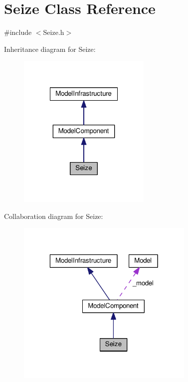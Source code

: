 \hypertarget{class_seize}{\section{Seize Class Reference}
\label{class_seize}
}


{\ttfamily \#include $<$Seize.\-h$>$}



Inheritance diagram for Seize\-:
\nopagebreak
\begin{figure}[H]
\begin{center}
\leavevmode
\includegraphics[width=180pt]{class_seize__inherit__graph}
\end{center}
\end{figure}


Collaboration diagram for Seize\-:
\nopagebreak
\begin{figure}[H]
\begin{center}
\leavevmode
\includegraphics[width=241pt]{class_seize__coll__graph}
\end{center}
\end{figure}
